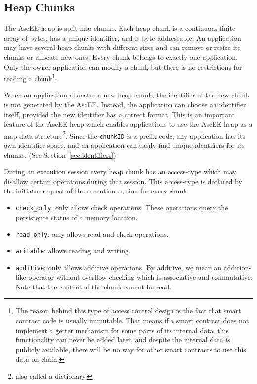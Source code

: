 \subsection{Heap Chunks}\label{subsec:heap}

The AscEE heap is split into chunks. Each heap chunk is a continuous finite array of bytes, has a unique identifier, and
is byte addressable. An application may have several heap chunks with different sizes and can remove or
resize its chunks or allocate new ones. Every chunk belongs to exactly one application. Only the owner application can
modify a chunk but there is no restrictions for reading a chunk\footnote{The reason behind this type of access
control design is the fact that smart contract
code is usually immutable. That means if a smart contract does not implement a
getter mechanism for some parts of its internal data, this functionality can never
be added later, and despite the internal data is publicly available, there will be no
way for other smart contracts to use this data on-chain.}.

When an application allocates a new heap chunk, the identifier of the new chunk is not generated by
the AscEE. Instead, the application can choose an identifier itself, provided the new identifier has a correct format.
This is an important feature of the AscEE heap which enables applications to use the AscEE heap as a map
data structure\footnote{also called a dictionary.}.
Since the \texttt{chunkID} is a prefix code, any application has its own identifier space, and an application
can easily find unique identifiers for its chunks. (See Section~\ref{sec:identifiers})

During an execution session every heap chunk has an access-type which may disallow certain operations during that
session. This access-type is declared by the initiator request of the execution session for every chunk:

\begin{itemize}
    \item \texttt{check\_only}: only allows check operations. These operations query the persistence
    status of a memory location.
    \item \texttt{read\_only}: only allows read and check operations.
    \item \texttt{writable}: allows reading and writing.
    \item \texttt{additive}: only allows additive operations. By additive, we mean an addition-like operator without
    overflow checking which is associative and commutative. Note that the content of the chunk cannot be read.
\end{itemize}

